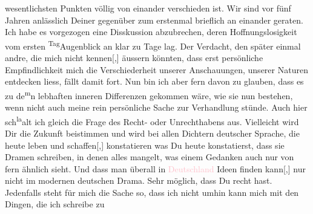                wesentlichsten Punkten völlig von einander verschieden ist. Wir sind vor fünf {\pb}Jahren anlässlich Deiner \label{K_L03520-11v}\label{K_L03520-11h} gegenüber zum erstenmal brieflich an
               einander geraten. Ich habe es vorgezogen eine Disskussion abzubrechen, deren
               Hoffnungslosigkeit vom ersten \substVorne{}\textsuperscript{Tag}\substDazwischen{}Augenblick\substHinten{} an klar zu Tage lag. Der Verdacht, den später einmal andre, die mich nicht
                  kennen{[},{]} äussern könnten, dass erst persönliche
               Empfindlichkeit mich die Verschiederheit unserer Anschauungen, unserer Naturen
               entdecken liess, fällt damit fort. Nun bin ich aber
               fern davon zu glauben, dass es zu de\substVorne{}\textsuperscript{m}\substDazwischen{}n\substHinten{} lebhaften inneren Differenzen gekommen wäre, wie sie nun bestehen, wenn
               nicht auch meine rein persönliche Sache zur Verhandlung stünde. Auch hier sch\substVorne{}\textsuperscript{la}\substDazwischen{}al\substHinten{}t ich gle\introOben{}i\introOben{}ch die Frage des Recht- oder
               Unrechthabens aus. Vielleicht wird Dir die Zukunft beisti\introOben{}m\introOben{}men und wird bei allen Dichtern deutscher Sprache, die heute leben und
                  schaffen{[},{]} konstatieren was Du heute konstatierst, dass sie
               Dramen schreiben, in denen alles mangelt, {\pb}was einem Gedanken auch nur von fern
               ähnlich sieht. Und dass man überall in \textcolor{pink}{Deutschland}{}\ledrightnote{\textcolor{pink}{Deutschland}} Ideen finden kann{[},{]} nur nicht im modernen
               deutschen Drama. Sehr möglich, dass Du recht hast. Jedenfalls steht für mich die
               Sache so, dass ich nicht umhin kann mich mit den Dingen, die ich schreibe zu
